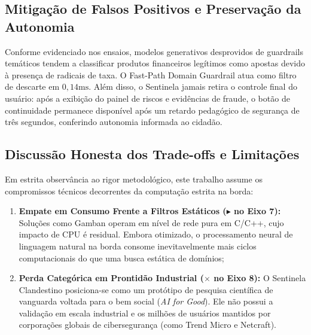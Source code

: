 \subsection{Mitiga\c{c}\~{a}o de Falsos Positivos e Preserva\c{c}\~{a}o da Autonomia}

Conforme evidenciado nos ensaios, modelos generativos desprovidos de guardrails tem\'{a}ticos tendem a classificar produtos financeiros leg\'{i}timos como apostas devido \`{a} presen\c{c}a de radicais de taxa. O Fast-Path Domain Guardrail atua como filtro de descarte em $0{,}14\text{ms}$. Al\'{e}m disso, o Sentinela jamais retira o controle final do usu\'{a}rio: ap\'{o}s a exibi\c{c}\~{a}o do painel de riscos e evid\^{e}ncias de fraude, o bot\~{a}o de continuidade permanece dispon\'{i}vel ap\'{o}s um retardo pedag\'{o}gico de seguran\c{c}a de tr\^{e}s segundos, conferindo autonomia informada ao cidad\~{a}o.

\subsection{Discuss\~{a}o Honesta dos Trade-offs e Limita\c{c}\~{o}es}

Em estrita observ\^{a}ncia ao rigor metodol\'{o}gico, este trabalho assume os compromissos t\'{e}cnicos decorrentes da computa\c{c}\~{a}o estrita na borda:
\begin{enumerate}
    \item \textbf{Empate em Consumo Frente a Filtros Est\'{a}ticos ($\blacktriangleright$ no Eixo 7):} Solu\c{c}\~{o}es como Gamban operam em n\'{i}vel de rede pura em C/C++, cujo impacto de CPU \'{e} residual. Embora otimizado, o processamento neural de linguagem natural na borda consome inevitavelmente mais ciclos computacionais do que uma busca est\'{a}tica de dom\'{i}nios;
    \item \textbf{Perda Categ\'{o}rica em Prontid\~{a}o Industrial ($\times$ no Eixo 8):} O Sentinela Clandestino posiciona-se como um prot\'{o}tipo de pesquisa cient\'{i}fica de vanguarda voltada para o bem social (\textit{AI for Good}). Ele n\~{a}o possui a valida\c{c}\~{a}o em escala industrial e os milh\~{o}es de usu\'{a}rios mantidos por corpora\c{c}\~{o}es globais de ciberseguran\c{c}a (como Trend Micro e Netcraft).
\end{enumerate}

\clearpage
